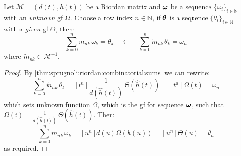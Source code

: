 \begin{theorem}
    Let $\mathcal{M}=(d(t),h(t))$ be a Riordan matrix and $\boldsymbol{\omega}$ 
    be a sequence $\lbrace\omega_{i}\rbrace_{i\in\mathbb{N}}$ with an \emph{unknown} 
    \ac{gf} $\Omega$. Choose a row index $n\in\mathbb{N}$, if $\boldsymbol{\theta}$ is a  
    sequence $\lbrace\theta_{i}\rbrace_{i\in\mathbb{N}}$ with a \emph{given} \ac{gf} $\Theta$, 
    then:
    \begin{displaymath}
        \sum_{k=0}^{n}{m_{nk}\,\omega_{k}}=\theta_{n}
            \quad\leftarrow\quad 
            \sum_{k=0}^{n}{\tilde{m}_{nk}\,\theta_{k}}=\omega_{n}
    \end{displaymath}
    where $\tilde{m}_{nk}\in\mathcal{M}^{-1}$.
\end{theorem}

\begin{proof}
    By \autoref{thm:sprugnoli:riordan:combinatorial:sums} we can rewrite:
    \begin{displaymath}
        \sum_{k=0}^{n}{\tilde{m}_{nk}\,\theta_{k}}
            = [t^{n}]\frac{1}{d(\hat{h}(t))}\,\Theta(\hat{h}(t)) 
            = [t^{n}]\Omega(t) = \omega_{n}
    \end{displaymath}
    which sets unknown function $\Omega$, which is the \ac{gf} for 
    sequence $\boldsymbol{\omega}$, such that $\Omega(t)=\frac{1}{d(\hat{h}(t))}\,\Theta(\hat{h}(t))$. 
    Then:
    \begin{displaymath}
        \sum_{k=0}^{n}{m_{nk}\,\omega_{k}}
            = [u^{n}]d(u)\Omega(h(u))
            = [u^{n}]\Theta(u)
            = \theta_{n}
    \end{displaymath}
    as required.
\end{proof}
